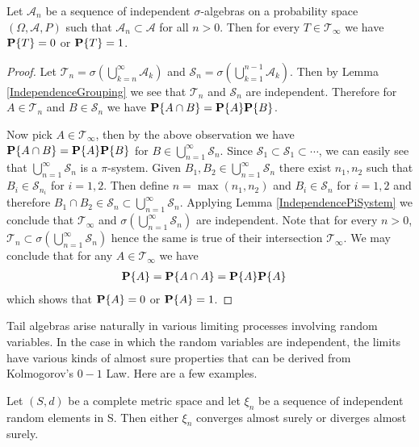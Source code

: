 \begin{thm}\label{Kolmogorov01Law}Let
  $\mathcal{A}_n$ be a sequence of independent $\sigma$-algebras on
  a probability space $(\Omega, \mathcal{A}, P)$ such that $\mathcal{A}_n
  \subset \mathcal{A}$ for all $n>0$.  Then for every $T \in \mathcal{T}_\infty$ we have
  $\textbf{P}\{T\}=0$ or $\textbf{P}\{T\} = 1$.
\end{thm}
\begin{proof}Let $\mathcal{T}_n = \sigma\left(\bigcup_{k=n}^\infty
    \mathcal{A}_k\right)$ and $\mathcal{S}_n = \sigma\left(\bigcup_{k=1}^{n-1}
    \mathcal{A}_k\right)$.  Then by Lemma \ref{IndependenceGrouping}
  we see that $\mathcal{T}_n$ and $\mathcal{S}_n$ are independent.
  Therefore for $A \in \mathcal{T}_n$ and $B \in \mathcal{S}_n$ we
  have $\textbf{P}\{A \cap B\} = \textbf{P}\{A\} \textbf{P}\{B\}$.

Now pick $A \in \mathcal{T}_\infty$, then by the above observation we
have $\textbf{P}\{A \cap B\} = \textbf{P}\{A\} \textbf{P}\{B\}$ for $B
\in \bigcup_{n=1}^\infty \mathcal{S}_n$.  Since $\mathcal{S}_1 \subset
\mathcal{S}_1 \subset \cdots$, we can easily see that
$\bigcup_{n=1}^\infty \mathcal{S}_n$ is a $\pi$-system.  Given $B_1,
B_2 \in \bigcup_{n=1}^\infty \mathcal{S}_n$ there exist $n_1,n_2$ such
that $B_i \in \mathcal{S}_{n_i}$ for $i=1,2$.  Then define $n =
\max(n_1,n_2)$ and $B_i \in \mathcal{S}_n$ for $i=1,2$ and therefore
$B_1 \cap B_2 \in \mathcal{S}_n \subset \bigcup_{n=1}^\infty
\mathcal{S}_n$.  Applying Lemma \ref{IndependencePiSystem} we conclude
that $\mathcal{T}_\infty$ and $\sigma(\bigcup_{n=1}^\infty
\mathcal{S}_n)$ are independent.  Note that for every $n>0$, $\mathcal{T}_n
\subset \sigma(\bigcup_{n=1}^\infty \mathcal{S}_n)$ hence the same is
true of their intersection $\mathcal{T}_\infty$.  We may conclude
that for any $A \in \mathcal{T}_\infty$ we have 
\begin{align*}
\textbf{P}\{A\} &= \textbf{P}\{A \cap A\} =
\textbf{P}\{A\}\textbf{P}\{A\}
\end{align*}
which shows that $\textbf{P}\{A\} = 0$ or $\textbf{P}\{A\} = 1$.
\end{proof}
Tail algebras arise naturally in various limiting processes involving
random variables.  In the case in which the random variables are
independent, the limits have various kinds of almost sure properties
that can be derived from Kolmogorov's $0-1$ Law.  Here are a few examples.
\begin{cor}Let $(S,d)$ be a complete metric space and let $\xi_n$ be a sequence of independent random elements in
  S.  Then either $\xi_n$ converges almost surely or diverges almost surely.
\end{cor}
